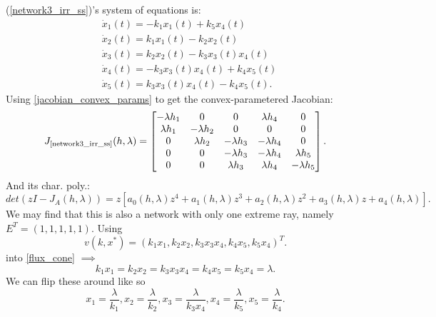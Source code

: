 (\ref{network3_irr_ss})'s system of equations is:
\begin{equation}\label{last_dyn_sys}
	\begin{aligned}&\dot{x}_1(t)=-k_1x_1(t)+k_5x_4(t)\\&\dot{x}_2(t)=k_1x_1(t)-k_2x_2(t)\\&\dot{x}_3(t)=k_2x_2(t)-k_3x_3(t)x_4(t)\\&\dot{x}_4(t)=-k_3x_3(t)x_4(t)+k_4x_5(t)\\&\dot{x}_5(t)=k_3x_3(t)x_4(t)-k_4x_5(t).
	\end{aligned}
\end{equation}
Using \ref{jacobian_convex_params} to get the convex-parametered Jacobian:
\[
	J_{\text{\ref{network3_irr_ss}}}(h,\lambda)=
	\begin{bmatrix}-\lambda h_{1}&0&0&\lambda h_{4}&0\\\lambda h_{1}&-\lambda h_{2}&0&0&0\\0&\lambda h_{2}&-\lambda h_{3}&-\lambda h_{4}&0\\0&0&-\lambda h_{3}&-\lambda h_{4}&\lambda h_{5}\\0&0&\lambda h_{3}&\lambda h_{4}&-\lambda h_{5}
	\end{bmatrix}.
\]
And its char. poly.:
\[
	det(zI-J_A(h,\lambda))=z[a_0(h,\lambda)z^4+a_1(h,\lambda)z^3+a_2(h,\lambda)z^2+a_3(h,\lambda)z+a_4(h,\lambda)].
\]
We may find that this is also a network with only one extreme ray, namely $E^T = \left(1,1,1,1,1\right)$. Using
\[
	v(k,x^*)=(k_1x_1,k_2x_2,k_3x_3x_4,k_4x_5,k_5x_4)^T.
\]
into \ref{flux_cone} $\implies$
\[
	k_1x_1=k_2x_2=k_3x_3x_4=k_4x_5=k_5x_4=\lambda.
\]
We can flip these around like so
\begin{equation}\label{last_jacobian}
	x_{1}=\frac{\lambda}{k_{1}},x_{2}=\frac{\lambda}{k_{2}},x_{3}=\frac{\lambda}{k_{3}x_{4}},x_{4}=\frac{\lambda}{k_{5}},x_{5}=\frac{\lambda}{k_{4}}.
\end{equation}


